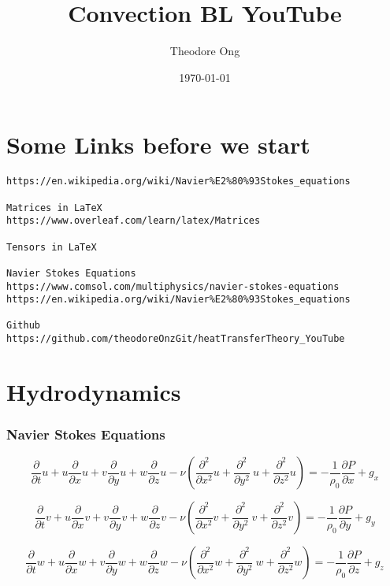 \documentclass[11pt]{article}
\begin{document}
\title{Convection BL YouTube}
\author{Theodore Ong}
\date{\today}
\maketitle


\part{Some Links before we start}

\begin{verbatim}
https://en.wikipedia.org/wiki/Navier%E2%80%93Stokes_equations

Matrices in LaTeX
https://www.overleaf.com/learn/latex/Matrices

Tensors in LaTeX

Navier Stokes Equations
https://www.comsol.com/multiphysics/navier-stokes-equations
https://en.wikipedia.org/wiki/Navier%E2%80%93Stokes_equations

Github
https://github.com/theodoreOnzGit/heatTransferTheory_YouTube
\end{verbatim}



\part{Hydrodynamics}
\section{Navier Stokes Equations}
$$\frac{\partial }{\partial t} u + u \frac{\partial}{\partial x} u + v \frac{\partial}{\partial y} u + w \frac{\partial}{\partial z} u - \nu ( \frac{\partial^2}{\partial x^2} u + \frac{\partial^2}{\partial y^2} \ u + \frac{\partial^2}{\partial z^2} u) = - \frac{1}{\rho_0} \frac{\partial P}{\partial x} +g_x$$

$$\frac{\partial }{\partial t} v + u \frac{\partial}{\partial x} v + v \frac{\partial}{\partial y} v + w \frac{\partial}{\partial z} v - \nu ( \frac{\partial^2}{\partial x^2} v + \frac{\partial^2}{\partial y^2} \ v + \frac{\partial^2}{\partial z^2} v) = - \frac{1}{\rho_0} \frac{\partial P}{\partial y} +g_y$$

$$\frac{\partial }{\partial t} w + u \frac{\partial}{\partial x} w + v \frac{\partial}{\partial y} w + w \frac{\partial}{\partial z} w - \nu ( \frac{\partial^2}{\partial x^2} w + \frac{\partial^2}{\partial y^2} \ w + \frac{\partial^2}{\partial z^2} w) = - \frac{1}{\rho_0} \frac{\partial P}{\partial z} +g_z$$
\end{document}
